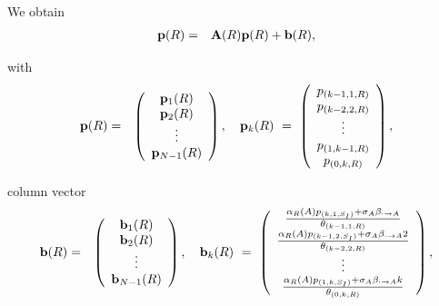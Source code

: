 \documentclass[10pt,A4paper]{article}
\begin{document}
\par\noindent We obtain
\begin{eqnarray}\label{eqn:9}
 {\bf p}(R) &=& {\bf A}(R){\bf p}(R)+{\bf b}(R),
\end{eqnarray}
\par\noindent with
\begin{eqnarray*}
 {\bf p}(R) &=& \left(\begin{array}{c}
                         {\bf p}_1(R)\\
{\bf p}_2(R)\\
\vdots\\
{\bf p}_{N-1}(R)
\end{array}\right),\quad {\bf p}_k(R) \ = \ \left(\begin{array}{c}
p_{(k-1,1,R)}\\
p_{(k-2,2,R)}\\
\vdots\\
p_{(1,k-1,R)}\\
p_{(0,k,R)}
\end{array}\right),
\end{eqnarray*}
\par\noindent column vector
\begin{eqnarray*}
{\bf b}(R) &=& \left(\begin{array}{c}
                          {\bf b}_1(R)\\
{\bf b}_2(R)\\
\vdots\\
{\bf b}_{N-1}(R)
                         \end{array}\right),\quad
{\bf b}_k(R) \ = \ \left(\begin{array}{c}
               \frac{\alpha_R(A)p_{(k,1,S_I)}+\sigma_A\beta_{\cdot\rightarrow A}}{\theta_{(k-1,1,R)}}\\
\frac{\alpha_R(A)p_{(k-1,2,S_I)}+\sigma_A\beta_{\cdot\rightarrow A}2}{\theta_{(k-2,2,R)}}\\
\vdots\\
\frac{\alpha_R(A)p_{(1,k,S_I)}+\sigma_A\beta_{\cdot\rightarrow A}k}{\theta_{(0,k,R)}}
                         \end{array}\right),
\end{eqnarray*}
\end{document}
